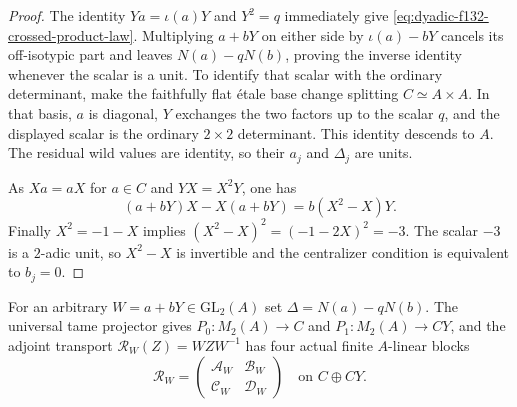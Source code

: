 \documentclass[11pt]{article}
\theoremstyle{definition}
\begin{document}
\begin{proof}
The identity $Ya=\iota(a)Y$
and $Y^2=q$ immediately give
\eqref{eq:dyadic-f132-crossed-product-law}.
Multiplying $a+bY$ on either side by
$\iota(a)-bY$ cancels its
off-isotypic part and leaves
$N(a)-qN(b)$, proving the
inverse identity whenever
the scalar is a unit.
To identify that scalar with
the ordinary determinant,
make the faithfully flat
\'etale base change splitting
$C\simeq A\times A$.
In that basis, $a$ is diagonal,
$Y$ exchanges the two factors
up to the scalar $q$, and
the displayed scalar is
the ordinary $2\times2$
determinant.  This identity
descends to $A$.
The residual wild values are
identity, so their $a_j$
and $\Delta_j$ are units.

As $Xa=aX$ for $a\in C$
and $YX=X^2Y$, one has
\[
(a+bY)X-X(a+bY)
=b(X^2-X)Y.
\]
Finally $X^2=-1-X$ implies
$(X^2-X)^2=(-1-2X)^2=-3$.
The scalar $-3$ is a $2$-adic
unit, so $X^2-X$ is invertible
and the centralizer condition
is equivalent to $b_j=0$.
\end{proof}

For an arbitrary
$W=a+bY\in\mathrm{GL}_2(A)$
set $\Delta=N(a)-qN(b)$.
The universal tame projector
gives $P_0:M_2(A)\to C$
and $P_1:M_2(A)\to CY$,
and the adjoint transport
$\mathcal R_W(Z)=WZW^{-1}$
has four actual finite
$A$-linear blocks
\[
\mathcal R_W=
\begin{pmatrix}
\mathcal A_W&\mathcal B_W\\
\mathcal C_W&\mathcal D_W
\end{pmatrix}
\quad\text{on }C\oplus CY.
\]
\end{document}
